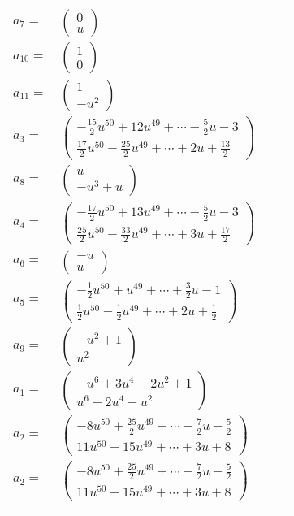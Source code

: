 \documentclass[1p]{elsarticle_modified}
\theoremstyle{definition}
\begin{document}
\begin{tabular}{m{7pt} m{180pt} m{7pt} m{180pt} }
\flushright $a_{7}=$&$\begin{pmatrix}0\\u\end{pmatrix}$ \\
\flushright $a_{10}=$&$\begin{pmatrix}1\\0\end{pmatrix}$ \\
\flushright $a_{11}=$&$\begin{pmatrix}1\\- u^2\end{pmatrix}$ \\
\flushright $a_{3}=$&$\begin{pmatrix}-\frac{15}{2} u^{50}+12 u^{49}+\cdots-\frac{5}{2} u-3\\\frac{17}{2} u^{50}-\frac{25}{2} u^{49}+\cdots+2 u+\frac{13}{2}\end{pmatrix}$ \\
\flushright $a_{8}=$&$\begin{pmatrix}u\\- u^3+u\end{pmatrix}$ \\
\flushright $a_{4}=$&$\begin{pmatrix}-\frac{17}{2} u^{50}+13 u^{49}+\cdots-\frac{5}{2} u-3\\\frac{25}{2} u^{50}-\frac{33}{2} u^{49}+\cdots+3 u+\frac{17}{2}\end{pmatrix}$ \\
\flushright $a_{6}=$&$\begin{pmatrix}- u\\u\end{pmatrix}$ \\
\flushright $a_{5}=$&$\begin{pmatrix}-\frac{1}{2} u^{50}+u^{49}+\cdots+\frac{3}{2} u-1\\\frac{1}{2} u^{50}-\frac{1}{2} u^{49}+\cdots+2 u+\frac{1}{2}\end{pmatrix}$ \\
\flushright $a_{9}=$&$\begin{pmatrix}- u^2+1\\u^2\end{pmatrix}$ \\
\flushright $a_{1}=$&$\begin{pmatrix}- u^6+3 u^4-2 u^2+1\\u^6-2 u^4- u^2\end{pmatrix}$ \\
\flushright $a_{2}=$&$\begin{pmatrix}-8 u^{50}+\frac{25}{2} u^{49}+\cdots-\frac{7}{2} u-\frac{5}{2}\\11 u^{50}-15 u^{49}+\cdots+3 u+8\end{pmatrix}$\\ \flushright $a_{2}=$&$\begin{pmatrix}-8 u^{50}+\frac{25}{2} u^{49}+\cdots-\frac{7}{2} u-\frac{5}{2}\\11 u^{50}-15 u^{49}+\cdots+3 u+8\end{pmatrix}$\\&\end{tabular}
\end{document}
